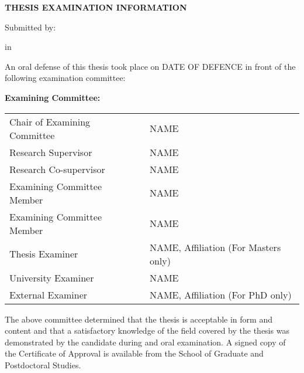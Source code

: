 
\cleardoublepage
\thispagestyle{plain}

\begin{center}
\textbf{THESIS EXAMINATION INFORMATION}

\bigskip

Submitted by:  \makeatletter\textbf{\@firstname\ {\@lastname}}\makeatother

\bigskip
\bigskip

\textbf{\degree} in \textbf{\program}

\end{center}


\bigskip
\bigskip

\noindent {}

\bigskip

An oral defense of this thesis took place on DATE OF DEFENCE in front of the following examination committee:

\medskip

\noindent\textbf{Examining Committee:}

\bigskip

\begingroup
\renewcommand{\arraystretch}{2}
\begin{tabular}{lcl}
    Chair of Examining Committee &\phantom{Alphabet}& NAME \\
    Research Supervisor && NAME\\
    Research Co-supervisor && NAME \\
    Examining Committee Member && NAME \\
    Examining Committee Member && NAME \\
    Thesis Examiner && NAME, Affiliation (For Masters only)\\
    University Examiner && NAME \\
    External Examiner && NAME, Affiliation (For PhD only)\\
\end{tabular}
\endgroup

\medskip

\noindent The above committee determined that the thesis is acceptable in form and content and that a satisfactory knowledge of the field covered by the thesis was demonstrated by the candidate during and oral examination. A signed copy of the Certificate of Approval is available from the School of Graduate and Postdoctoral Studies.




